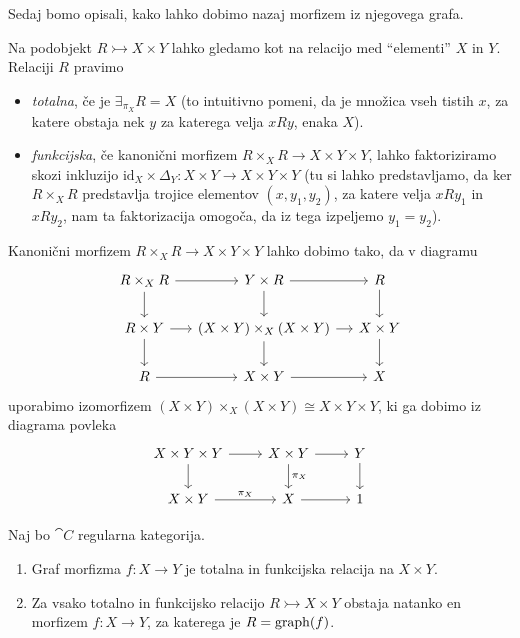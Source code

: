 \documentclass[../kategoricna_logika.tex]{subfiles}
\begin{document}
Sedaj bomo opisali, kako lahko dobimo nazaj morfizem iz njegovega
grafa.
\begin{definicija}
  Na podobjekt $R \rightarrowtail X \times Y$ lahko gledamo kot na
  relacijo med ``elementi'' $X$ in $Y$. Relaciji $R$ pravimo
  \begin{itemize}
  \item \emph{totalna}, če je $\exists_{\pi_X}R = X$ (to intuitivno
    pomeni, da je množica vseh tistih $x$, za katere obstaja nek $y$
    za katerega velja $xRy$, enaka $X$).
  \item \emph{funkcijska}, če kanonični morfizem
    $R \times_X R \to X \times Y \times Y$, lahko faktoriziramo skozi
    inkluzijo
    $\mathrm{id}_X \times \Delta_Y : X \times Y \to X \times Y \times
    Y$ (tu si lahko predstavljamo, da ker $R \times_X R$ predstavlja
    trojice elementov $(x, y_1, y_2)$, za katere velja $xRy_1$ in
    $xRy_2$, nam ta faktorizacija omogoča, da iz tega izpeljemo
    $y_1 = y_2$).
  \end{itemize}
\end{definicija}
\begin{opomba}
  Kanonični morfizem $R \times_X R \to X \times Y \times Y$ lahko
  dobimo tako, da v diagramu
  \begin{equation*}
    \begin{tikzcd}[row sep=normal, column sep=small]
      R \times_X R \ar[d] \ar[r] & Y \times R \ar[d] \ar[r] & R \ar[d] \\
      R \times Y \ar[d] \ar[r] & (X \times Y) \times_X (X \times Y)
      \ar[d] \ar[r] &
      X \times Y \ar[d] \\
      R \ar[r] & X \times Y \ar[r] & X
    \end{tikzcd}
  \end{equation*}
  uporabimo izomorfizem
  $(X \times Y) \times_X (X \times Y) \cong X \times Y \times Y$, ki
  ga dobimo iz diagrama povleka
  \begin{equation*}
    \begin{tikzcd}[row sep=normal, column sep=normal]
      X \times Y  \times Y\ar[d] \ar[r] & X \times Y \ar[d, "\pi_X"] \ar[r] & Y \ar[d] \\
      X \times Y \ar[r, "\pi_X"] & X \ar[r] & 1
    \end{tikzcd}
  \end{equation*}
\end{opomba}
\begin{lema}\label{lema:funkcijska-relacija-ima-graf}
  Naj bo $\cat{C}$ regularna kategorija.
  \begin{enumerate}[label=(\roman*)]
  \item Graf morfizma $f : X \to Y$ je totalna in funkcijska relacija
    na $X \times Y$.
  \item Za vsako totalno in funkcijsko relacijo
    $R \rightarrowtail X \times Y$ obstaja natanko en morfizem
    $f : X \to Y$, za katerega je $R = \operatorname{graph}(f)$.
  \end{enumerate}
\end{lema}
\end{document}
